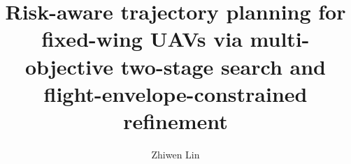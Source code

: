 \documentclass[12pt]{article}
\begin{document}
\title{Risk-aware trajectory planning for fixed-wing UAVs via multi-objective two-stage search and flight-envelope-constrained refinement}
\author{Zhiwen Lin}
\date{}
\maketitle
\begin{abstract}

\end{abstract}






\end{document}
